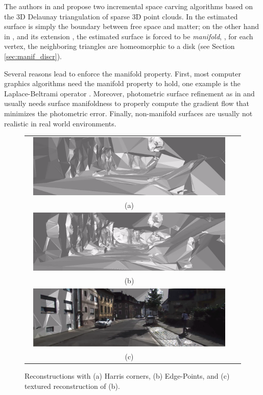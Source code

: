 The authors in \cite{lovi_et_al_11}  and \cite{litvinov_lhuillier_13} propose two incremental space carving algorithms based on the 3D Delaunay triangulation of sparse 3D point clouds. 
In \cite{lovi_et_al_11} the estimated surface is simply the boundary between free space and matter; on the other hand in \cite{litvinov_lhuillier_13}, and its extension \cite{litvinov_Lhiuller14}, the estimated surface is forced to be \emph{manifold}, \ie, for each vertex, the neighboring triangles are homeomorphic to a disk (see Section \ref{sec:manif_discr}). 

Several reasons lead to enforce the manifold property. First, most computer graphics algorithms need the manifold property to hold, one example is the Laplace-Beltrami operator \cite{Meyer03}.
Moreover, photometric surface refinement as in \cite{vu_et_al_2012} and \cite{delaunoy_et_al_08} usually needs surface manifoldness to properly compute the gradient flow that minimizes the photometric error. Finally, non-manifold surfaces are usually not realistic in real world environments.


\begin{figure}[tp]
\centering
\begin{tabular}{cc}
\includegraphics[width=0.95\textwidth]{./img//reconstrHarris}\\
(a)\\
\includegraphics[width=0.95\textwidth]{./img//reconstr}\\
(b)\\
\includegraphics[width=0.95\textwidth]{./img//reconstrTex}\\
(c)\\
\end{tabular}
\caption{Reconstructions with (a) Harris corners, (b) Edge-Points, and (c) textured reconstruction of (b).}
\label{fig:recons}
\end{figure}

